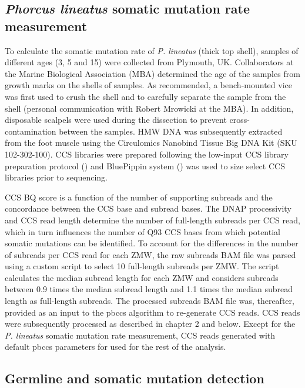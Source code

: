 \subsection{\textit{Phorcus lineatus} somatic mutation rate measurement}

To calculate the somatic mutation rate of \textit{P. lineatus} (thick top shell), samples of different ages (3, 5 and 15) were collected from Plymouth, UK. Collaborators at the Marine Biological Association (MBA) determined the age of the samples from growth marks on the shells of samples. As recommended, a bench-mounted vice was first used to crush the shell and to carefully separate the sample from the shell (personal communication with Robert Mrowicki at the MBA). In addition, disposable scalpels were used during the dissection to prevent cross-contamination between the samples. HMW DNA was subsequently extracted from the foot muscle using the Circulomics Nanobind Tissue Big DNA Kit (SKU 102-302-100). CCS libraries were prepared following the low-input CCS library preparation protocol () and BluePippin system () was used to size select CCS libraries prior to sequencing.

CCS BQ score is a function of the number of supporting subreads and the concordance between the CCS base and subread bases. The DNAP processivity and CCS read length determine the number of full-length subreads per CCS read, which in turn influences the number of Q93 CCS bases from which potential somatic mutations can be identified. To account for the differences in the number of subreads per CCS read for each ZMW, the raw subreads BAM file was parsed using a custom script to select 10 full-length subreads per ZMW. The script calculates the median subread length for each ZMW and considers subreads between 0.9 times the median subread length and 1.1 times the median subread length as full-length subreads. The processed subreads BAM file was, thereafter, provided as an input to the pbccs algorithm to re-generate CCS reads. CCS reads were subsequently processed as described in chapter 2 and below. Except for the \textit{P. lineatus} somatic mutation rate measurement, CCS reads generated with default pbccs parameters for used for the rest of the analysis. 

\subsection{Germline and somatic mutation detection}


